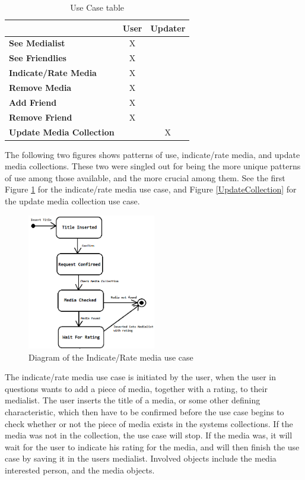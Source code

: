 \begin{table}[htb]
\centering
\begin{tabular}{|l|c|c|} \hline
	  & \textbf{User} & \textbf{Updater} \\ \hline
	\textbf{See Medialist} & X &  \\ \hline
	\textbf{See Friendlies} & X &  \\ \hline
	\textbf{Indicate/Rate Media} & X &  \\ \hline
	\textbf{Remove Media} & X &  \\ \hline
	\textbf{Add Friend} & X &  \\ \hline
	\textbf{Remove Friend} & X &  \\ \hline
	\textbf{Update Media Collection} &  & X \\ \hline
\end{tabular}
\caption{Use Case table}
\label{UseTable}
\end{table}

The following two figures shows patterns of use, indicate/rate media, and update media collections. These two were singled out for being the more unique patterns of use among those available, and the more crucial among them. See the first Figure \ref{IndicateMedia} for the indicate/rate media use case, and Figure \ref{UpdateCollection} for the update media collection use case.

\begin{figure}[htb]
\centering
\includegraphics[width=0.5\textwidth]{Images/IndicateMedia.png}
\caption{Diagram of the Indicate/Rate media use case}
\label{IndicateMedia}
\end{figure}

The indicate/rate media use case is initiated by the user, when the user in questions wants to add a piece of media, together with a rating, to their medialist. The user inserts the title of a media, or some other defining characteristic, which then have to be confirmed before the use case begins to check whether or not the piece of media exists in the systems collections. If the media was not in the collection, the use case will stop. If the media was, it will wait for the user to indicate his rating for the media, and will then finish the use case by saving it in the users medialist. Involved objects include the media interested person, and the media objects.

